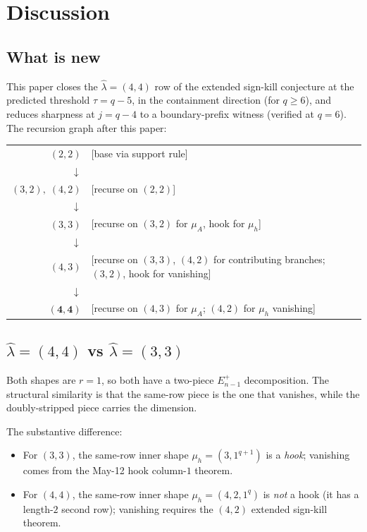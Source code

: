 \documentclass[11pt]{article}
\theoremstyle{definition}
\newcommand{\hatl}{\widehat\lambda}
\begin{document}
\section{Discussion}\label{sec:discussion}

\subsection{What is new}

This paper closes the $\hatl = (4, 4)$ row of the extended sign-kill
conjecture at the predicted threshold $\tau = q - 5$, in the
containment direction (for $q \ge 6$), and reduces sharpness at
$j = q - 4$ to a boundary-prefix witness (verified at $q = 6$).
The recursion graph after this paper:
\begin{center}
\begin{tabular}{rl}
$(2, 2)$ & [base via support rule] \\
$\downarrow$ \\
$(3, 2),\;(4, 2)$ & [recurse on $(2, 2)$] \\
$\downarrow$ \\
$(3, 3)$ & [recurse on $(3, 2)$ for $\mu_A$, hook for $\mu_h$] \\
$\downarrow$ \\
$(4, 3)$ & [recurse on $(3, 3)$, $(4, 2)$ for contributing branches;
            $(3, 2)$, hook for vanishing] \\
$\downarrow$ \\
$\mathbf{(4, 4)}$ & [recurse on $(4, 3)$ for $\mu_A$; $(4, 2)$ for $\mu_h$ vanishing]
\end{tabular}
\end{center}

\subsection{$\hatl = (4, 4)$ vs $\hatl = (3, 3)$}

Both shapes are $r = 1$, so both have a two-piece $E_{n-1}^+$
decomposition.  The structural similarity is that the same-row
piece is the one that vanishes, while the doubly-stripped piece
carries the dimension.

The substantive difference:
\begin{itemize}[topsep=0.2em,itemsep=0.1em]
\item For $(3, 3)$, the same-row inner shape $\mu_h = (3, 1^{q+1})$
is a \emph{hook}; vanishing comes from the May-12 hook column-$1$
theorem.
\item For $(4, 4)$, the same-row inner shape $\mu_h = (4, 2, 1^q)$
is \emph{not} a hook (it has a length-$2$ second row); vanishing
requires the $(4, 2)$ extended sign-kill theorem.
\end{itemize}
\end{document}
